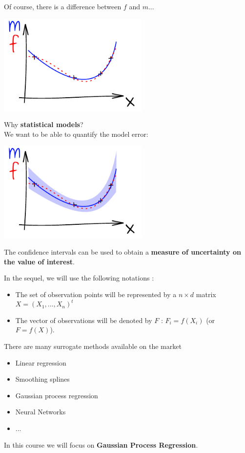 \begin{frame}{}
Of course, there is a difference between $f$ and $m$...
\begin{center}
\includegraphics[height=5cm]{1_stat_models/figures/ink_mf}
\end{center}
\end{frame}

\begin{frame}{}
Why \textbf{statistical models}? \\We want to be able to quantify the model error:
\begin{center}
\includegraphics[height=5cm]{1_stat_models/figures/ink_mconfint}
\end{center}
The confidence intervals can be used to obtain a \textbf{measure of uncertainty on the value of interest}.
\end{frame}

\begin{frame}{}
In the sequel, we will use the following notations :
\begin{itemize}
	\item The set of observation points will be represented by a $n \times d$ matrix $X=(X_1, ..., X_n)^t$
	\item The vector of observations will be denoted by $F$ : $F_i=f(X_i)$ (or $F=f(X)$).
\end{itemize}
There are many surrogate methods available on the market
\begin{itemize}
	\item Linear regression
	\item Smoothing splines
	\item Gaussian process regression
	\item Neural Networks
    \item ...
\end{itemize}
In this course we will focus on \textbf{Gaussian Process Regression}.
\end{frame}

